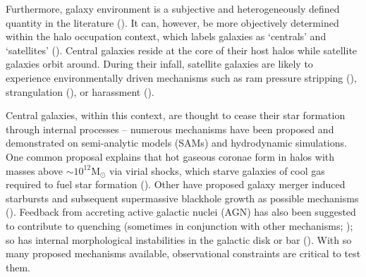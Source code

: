 \documentclass[iop,apj,tighten,twocolappendix,numberedappendix]{emulateapj}
\begin{document}
Furthermore, galaxy environment is a subjective and heterogeneously 
defined quantity in the literature (\citealt{Muldrew:2012aa}). 
It can, however, be more objectively determined within 
the halo occupation context, which labels galaxies as `centrals' and `satellites'
(\citealt{Zheng:2005aa, Weinmann:2006aa, Blanton:2007ab, Tinker:2011aa}). 
Central galaxies reside at the core of their host halos while 
satellite galaxies orbit around. %
During their infall, satellite galaxies are likely to experience 
environmentally driven mechanisms such as ram pressure stripping 
(\citealt{Gunn:1972aa, Bekki:2009aa}),  strangulation 
(\citealt{Larson:1980aa, Balogh:2000aa}), or 
harassment (\citealt{Moore:1998aa}). 

Central galaxies, within this context, are thought to cease their 
star formation through internal processes -- numerous mechanisms have been 
proposed and demonstrated on semi-analytic models (SAMs) 
and hydrodynamic simulations.
One common proposal explains
that hot gaseous coronae form in halos with masses above 
$\sim 10^{12}\mathrm{M}_\odot$ via virial shocks, which starve galaxies 
of cool gas required to fuel star formation 
(\citealt{Birnboim:2003aa, Keres:2005aa,Croton:2006aa,Cattaneo:2006aa, Dekel:2006aa}). 
Other have proposed galaxy merger induced starbursts and subsequent
supermassive blackhole growth as possible mechanisms
(\citealt{Springel:2005aa, DiMatteo:2005aa, Hopkins:2006aa, Hopkins:2008ab, Hopkins:2008aa}). 
Feedback from accreting 
active galactic nuclei (AGN) has also been suggested to contribute to 
quenching (sometimes in conjunction with other mechanisms;
\citealt{Croton:2006aa,Cattaneo:2006aa,Gabor:2011aa}); so has internal 
morphological instabilities in the galactic disk or bar 
(\citealt{Cole:2000aa, Martig:2009aa}). With so many proposed mechanisms  
available, observational constraints are critical to test them.

\end{document}
